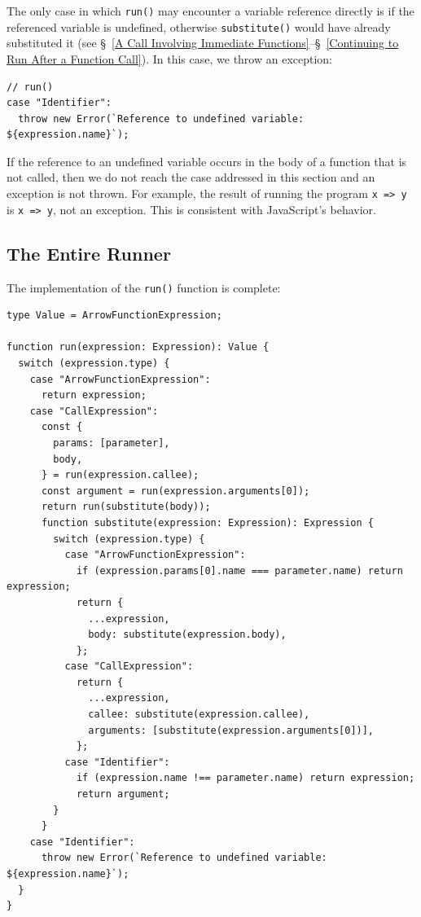 \documentclass[12pt, oneside]{book}
\begin{document}
The only case in which \texttt{run()} may encounter a variable reference directly is if the referenced variable is undefined, otherwise \texttt{substitute()} would have already substituted it (see §~\ref{A Call Involving Immediate Functions}–§~\ref{Continuing to Run After a Function Call}). In this case, we throw an exception:

\begin{verbatim}
// run()
case "Identifier":
  throw new Error(`Reference to undefined variable: ${expression.name}`);
\end{verbatim}

If the reference to an undefined variable occurs in the body of a function that is not called, then we do not reach the case addressed in this section and an exception is not thrown. For example, the result of running the program \texttt{x => y} is \texttt{x => y}, not an exception. This is consistent with JavaScript’s behavior.

\subsection{The Entire Runner}
\label{The Entire Runner}

The implementation of the \texttt{run()} function is complete:

\begin{verbatim}
type Value = ArrowFunctionExpression;

function run(expression: Expression): Value {
  switch (expression.type) {
    case "ArrowFunctionExpression":
      return expression;
    case "CallExpression":
      const {
        params: [parameter],
        body,
      } = run(expression.callee);
      const argument = run(expression.arguments[0]);
      return run(substitute(body));
      function substitute(expression: Expression): Expression {
        switch (expression.type) {
          case "ArrowFunctionExpression":
            if (expression.params[0].name === parameter.name) return expression;
            return {
              ...expression,
              body: substitute(expression.body),
            };
          case "CallExpression":
            return {
              ...expression,
              callee: substitute(expression.callee),
              arguments: [substitute(expression.arguments[0])],
            };
          case "Identifier":
            if (expression.name !== parameter.name) return expression;
            return argument;
        }
      }
    case "Identifier":
      throw new Error(`Reference to undefined variable: ${expression.name}`);
  }
}
\end{verbatim}
\end{document}
